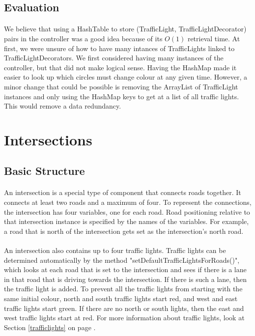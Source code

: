 \documentclass[a4paper,11pt,titlepage]{article}
\begin{document}
\subsection{Evaluation}
\paragraph{}
We believe that using a HashTable to store (TrafficLight, TrafficLightDecorator) pairs in the controller was a good idea because of its $O(1)$ retrieval time. At first, we were unsure of how to have many intances of TrafficLights linked to TrafficLightDecorators. We first considered having many instances of the controller, but that did not make logical sense. Having the HashMap made it easier to look up which circles must change colour at any given time. However, a minor change that could be possible is removing the ArrayList of TrafficLight instances and only using the HashMap keys to get at a list of all traffic lights. This would remove a data redundancy.

\section{Intersections}\label{intersectionsection}
\subsection{Basic Structure}
\paragraph{}
An intersection is a special type of component that connects roads together. It connects at least two roads and a maximum of four. To represent the connections, the intersection has four variables, one for each road. Road positioning relative to that intersection instance is specified by the names of the variables. For example, a road that is north of the intersection gets set as the intersection's north road.
\paragraph{}
An intersection also contains up to four traffic lights. Traffic lights can be determined automatically by the method "setDefaultTrafficLightsForRoads()", which looks at each road that is set to the intersection and sees if there is a lane in that road that is driving towards the intersection. If there is such a lane, then the traffic light is added. To prevent all the traffic lights from starting with the same initial colour, north and south traffic lights start red, and west and east traffic lights start green. If there are no north or south lights, then the east and west traffic lights start at red. For more information about traffic lights, look at Section \ref{trafficlights} on page \pageref{trafficlights}.
\end{document}

